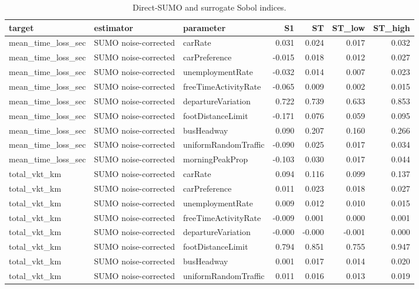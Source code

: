 \begin{table}[!htbp]
\centering
\small
\caption{Direct-SUMO and surrogate Sobol indices.}
\label{tab:sobol}
\begin{tabular}{lllrrrr}
\toprule
target & estimator & parameter & S1 & ST & ST\_low & ST\_high \\
\midrule
mean\_time\_loss\_sec & SUMO noise-corrected & carRate & 0.031 & 0.024 & 0.017 & 0.032 \\
mean\_time\_loss\_sec & SUMO noise-corrected & carPreference & -0.015 & 0.018 & 0.012 & 0.027 \\
mean\_time\_loss\_sec & SUMO noise-corrected & unemploymentRate & -0.032 & 0.014 & 0.007 & 0.023 \\
mean\_time\_loss\_sec & SUMO noise-corrected & freeTimeActivityRate & -0.065 & 0.009 & 0.002 & 0.015 \\
mean\_time\_loss\_sec & SUMO noise-corrected & departureVariation & 0.722 & 0.739 & 0.633 & 0.853 \\
mean\_time\_loss\_sec & SUMO noise-corrected & footDistanceLimit & -0.171 & 0.076 & 0.059 & 0.095 \\
mean\_time\_loss\_sec & SUMO noise-corrected & busHeadway & 0.090 & 0.207 & 0.160 & 0.266 \\
mean\_time\_loss\_sec & SUMO noise-corrected & uniformRandomTraffic & -0.090 & 0.025 & 0.017 & 0.034 \\
mean\_time\_loss\_sec & SUMO noise-corrected & morningPeakProp & -0.103 & 0.030 & 0.017 & 0.044 \\
total\_vkt\_km & SUMO noise-corrected & carRate & 0.094 & 0.116 & 0.099 & 0.137 \\
total\_vkt\_km & SUMO noise-corrected & carPreference & 0.011 & 0.023 & 0.018 & 0.027 \\
total\_vkt\_km & SUMO noise-corrected & unemploymentRate & 0.009 & 0.012 & 0.010 & 0.015 \\
total\_vkt\_km & SUMO noise-corrected & freeTimeActivityRate & -0.009 & 0.001 & 0.000 & 0.001 \\
total\_vkt\_km & SUMO noise-corrected & departureVariation & -0.000 & -0.000 & -0.001 & 0.000 \\
total\_vkt\_km & SUMO noise-corrected & footDistanceLimit & 0.794 & 0.851 & 0.755 & 0.947 \\
total\_vkt\_km & SUMO noise-corrected & busHeadway & 0.001 & 0.017 & 0.014 & 0.020 \\
total\_vkt\_km & SUMO noise-corrected & uniformRandomTraffic & 0.011 & 0.016 & 0.013 & 0.019 \\

\end{tabular}
\end{table}
